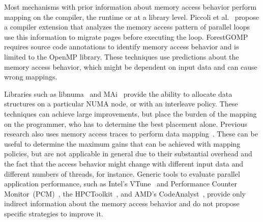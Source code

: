 

Most mechanisms with prior information about memory access behavior perform
mapping on the compiler, the runtime or at a library level.
Piccoli et al.~\cite{Piccoli2014} propose a compiler extension that analyzes
the memory access pattern of parallel loops use this information to migrate
pages before executing the loop.
ForestGOMP~\cite{Broquedis2010a} requires source code annotations to identify memory access behavior and is limited to the OpenMP library.
These techniques use predictions about the memory access behavior, which might be dependent on input data and can cause wrong mappings.

Libraries such as libnuma~\cite{Kleen2004} and MAi~\cite{Ribeiro2009} provide the ability
to allocate data structures on a particular NUMA node, or with an interleave
policy. These techniques can achieve large improvements, but place the burden
of the mapping on the programmer, who has to determine the best placement
alone.
%
Previous research also uses memory access traces to perform data mapping~\cite{Diener2015,Marathe2010,Bolosky1992}. These can be useful to determine the maximum gains that can be achieved with mapping policies, but are not applicable in general due to their substantial overhead and the fact that the access behavior might change with different input data and different numbers of threads, for instance.
Generic tools to evaluate parallel application performance, such as Intel's VTune~\cite{Reinders05VTune} and Performance Counter Monitor~(PCM)~\cite{Intel2012b}, the HPCToolkit~\cite{Adhianto10HPCTOOLKIT}, and AMD's CodeAnalyst~\cite{Drongowski2008}, provide only indirect information about the memory access behavior and do not propose specific strategies to improve it.


